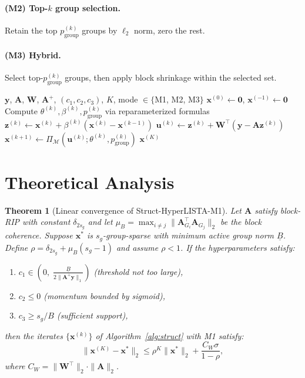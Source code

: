 \documentclass{article}
\newtheorem{theorem}{Theorem}
\begin{document}
\paragraph{(M2) Top-$k$ group selection.} Retain the top $p^{(k)}_{\text{group}}$ groups by $\ell_2$ norm, zero the rest.

\paragraph{(M3) Hybrid.} Select top-$p^{(k)}_{\text{group}}$ groups, then apply block shrinkage within the selected set.

\begin{algorithm}[t]
\caption{Struct-HyperLISTA}
\label{alg:struct}
\begin{algorithmic}[1]
\REQUIRE $\mathbf{y}$, $\mathbf{A}$, $\mathbf{W}$, $\mathbf{A}^+$, $(c_1, c_2, c_3)$, $K$, mode $\in \{$M1, M2, M3$\}$
\STATE $\mathbf{x}^{(0)} \leftarrow \mathbf{0}$, $\mathbf{x}^{(-1)} \leftarrow \mathbf{0}$
    \STATE Compute $\theta^{(k)}, \beta^{(k)}, p^{(k)}_{\text{group}}$ via reparameterized formulas
    \STATE $\mathbf{z}^{(k)} \leftarrow \mathbf{x}^{(k)} + \beta^{(k)}(\mathbf{x}^{(k)} - \mathbf{x}^{(k-1)})$
    \STATE $\mathbf{u}^{(k)} \leftarrow \mathbf{z}^{(k)} + \mathbf{W}^\top(\mathbf{y} - \mathbf{A}\mathbf{z}^{(k)})$
    \STATE $\mathbf{x}^{(k+1)} \leftarrow \Pi_{\mathcal{M}}(\mathbf{u}^{(k)}; \theta^{(k)}, p^{(k)}_{\text{group}})$
\ENDFOR
\RETURN $\mathbf{x}^{(K)}$
\end{algorithmic}
\end{algorithm}

\section{Theoretical Analysis}

\begin{theorem}[Linear convergence of Struct-HyperLISTA-M1]
\label{thm:convergence}
Let $\mathbf{A}$ satisfy block-RIP with constant $\delta_{2s_g}$ and let $\mu_B = \max_{i \neq j} \|\mathbf{A}_{G_i}^\top \mathbf{A}_{G_j}\|_2$ be the block coherence. Suppose $\mathbf{x}^*$ is $s_g$-group-sparse with minimum active group norm $\underline{B}$. Define $\rho = \delta_{2s_g} + \mu_B(s_g - 1)$ and assume $\rho < 1$. If the hyperparameters satisfy:
\begin{enumerate}
    \item[(i)] $c_1 \in \left(0,\; \frac{\underline{B}}{2\|\mathbf{A}^+\mathbf{y}\|_1}\right)$ (threshold not too large),
    \item[(ii)] $c_2 \leq 0$ (momentum bounded by sigmoid),
    \item[(iii)] $c_3 \geq s_g / B$ (sufficient support),
\end{enumerate}
then the iterates $\{\mathbf{x}^{(k)}\}$ of Algorithm~\ref{alg:struct} with M1 satisfy:
\begin{equation}
\|\mathbf{x}^{(K)} - \mathbf{x}^*\|_2 \leq \rho^K \|\mathbf{x}^*\|_2 + \frac{C_W \sigma}{1 - \rho},
\label{eq:convergence}
\end{equation}
where $C_W = \|\mathbf{W}^\top\|_2 \cdot \|\mathbf{A}\|_2$.
\end{theorem}
\end{document}
